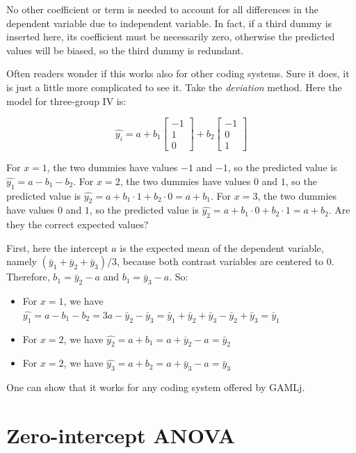 \documentclass[
]{book}
\providecommand{\tightlist}{%
  \setlength{\itemsep}{0pt}\setlength{\parskip}{0pt}}
\begin{document}
No other coefficient or term is needed to account for all differences in the dependent variable due to independent variable. In fact, if a third dummy is inserted here, its coefficient must be necessarily zero, otherwise the predicted values will be biased, so the third dummy is redundant.

Often readers wonder if this works also for other coding systems. Sure it does, it is just a little more complicated to see it. Take the \emph{deviation} method. Here the model for three-group IV is:

\[
\hat{y_i}=a+b_1 \begin{bmatrix}
-1 \\
1 \\
0
\end{bmatrix} +b_2 \begin{bmatrix}
-1 \\
0 \\
1
\end{bmatrix}
\]

For \(x=1\), the two dummies have values \(-1\) and \(-1\), so the predicted value is \(\hat{y_1}=a-b_1-b_2\). For \(x=2\), the two dummies have values \(0\) and \(1\), so the predicted value is \(\hat{y_2}=a+b_1 \cdot 1 +b_2 \cdot 0 =a+b_1\). For \(x=3\), the two dummies have values \(0\) and \(1\), so the predicted value is \(\hat{y_2}=a+b_1 \cdot 0 +b_2 \cdot 1 =a+b_2\). Are they the correct expected values?

First, here the intercept \(a\) is the expected mean of the dependent variable, namely \((\bar{y}_1+\bar{y}_2+\bar{y}_3)/3\), because both contrast variables are centered to 0. Therefore, \(b_1=\bar{y}_2-a\) and \(b_1=\bar{y}_3-a\). So:

\begin{itemize}
\tightlist
\item
  For \(x=1\), we have \(\hat{y_1}=a-b_1-b_2=3a-\bar{y}_2-\bar{y}_3=\bar{y}_1+\bar{y}_2+\bar{y}_3-\bar{y}_2+\bar{y}_3=\bar{y}_1\)
\item
  For \(x=2\), we have \(\hat{y_2}=a+b_1=a+\bar{y}_2-a=\bar{y}_2\)
\item
  For \(x=2\), we have \(\hat{y_3}=a+b_2=a+\bar{y}_3-a=\bar{y}_3\)
\end{itemize}

One can show that it works for any coding system offered by {GAMLj}.

\hypertarget{zero-intercept-anova}{%
\section{Zero-intercept ANOVA}\label{zero-intercept-anova}}
\end{document}
